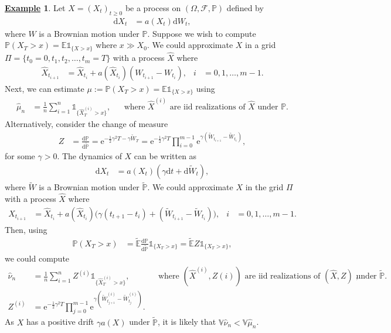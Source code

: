 \documentclass[12pt]{book}
\numberwithin{equation}{chapter}
\theoremstyle{plain}
\numberwithin{theorem}{section}
\theoremstyle{definition}
\newtheorem{example}[theorem]{\underline{Example}}
\numberwithin{exercise}{chapter}
\newcommand{\<}{\langle}
\renewcommand{\>}{\rangle}
\renewcommand{\(}{\left(}
\renewcommand{\)}{\right)}
\renewcommand{\[}{\left[}
\renewcommand{\]}{\right]}
\newcommand\Eb{\mathds{E}}
\newcommand\Ib{\mathds{1}} 	%
\newcommand\Pb{\mathds{P}}
\newcommand\Vb{\mathds{V}}
\newcommand\Fc{\mathscr{F}}
\newcommand\Om{\Omega}
\newcommand\gam{\gamma}
\newcommand\Xh{\widehat{X}}
\newcommand\nuh{\widehat{\nu}}
\newcommand\muh{\widehat{\mu}}
\newcommand\Ebt{\widetilde{\Eb}}
\newcommand\Pbt{\widetilde{\Pb}}
\newcommand\Wt{\widetilde{W}}
\newcommand\dd{\mathrm{d}}
\newcommand\ee{\mathrm{e}}
\begin{document}
\begin{example}
Let $X = (X_t)_{t \geq 0}$ be a process on $(\Om,\Fc,\Pb)$ defined by
\begin{align}
\dd X_t
	&=	a(X_t) \dd W_t ,
\end{align}
where $W$ is a Brownian motion under $\Pb$.  Suppose we wish to compute $\Pb( X_T > x ) = \Eb \Ib_{\{ X > x \} }$ where $x \gg X_0$.
We could approximate $X$ in a grid $\Pi = \{ t_0 = 0, t_1, t_2, \ldots, t_m = T \}$ with a process $\Xh$ where
\begin{align}
\Xh_{t_{i+1}}
	&=	\Xh_{t_i} + a(\Xh_{t_i}) (W_{t_{i+1}} - W_{t_i}) , &
i
	&=	0, 1, \ldots, m-1 .
\end{align}
Next, we can estimate $\mu:= \Pb( X_T > x ) = \Eb \Ib_{\{ X > x \} }$ using
\begin{align}
\muh_n
	&=	\frac{1}{n} \sum_{i=1}^n \Ib_{\{ \Xh_T^{(i)} > x \} } , &
	&\text{where $\Xh^{(i)}$ are iid realizations of $\Xh$ under $\Pb$.}
\end{align}
Alternatively, consider the change of measure
\begin{align}
Z
	&=	\frac{\dd \Pb}{\dd \Pbt}
	=		\ee^{ -\tfrac{1}{2} \gam^2 T - \gam \Wt_T } 
	=		\ee^{ -\tfrac{1}{2} \gam^2 T } \prod_{i=0}^{m-1} \ee^{ \gam (\Wt_{t_{i+1}} - \Wt_{t_i} ) } ,
\end{align}
for some $\gam > 0$.
The dynamics of $X$ can be written as
\begin{align}
\dd X_t
	&=	a(X_t) (\gam \dd t + \dd \Wt_t ) ,
\end{align}
where $\Wt$ is a Brownian motion under $\Pbt$.  We could approximate $X$ in the grid $\Pi$ with a process $\Xh$ where
\begin{align}
\Xh_{t_{i+1}}
	&=	\Xh_{t_i} + a(\Xh_{t_i}) \Big( \gam (t_{t+1} - t_i ) + (\Wt_{t_{i+1}} - \Wt_{t_i}) \Big) , &
i
	&=	0, 1, \ldots, m-1 .
\end{align}
Then, using
\begin{align}
\Pb( X_T >x)
	&=	\Ebt \frac{\dd \Pb}{ \dd \Pbt} \Ib_{\{ X_T > x \}}
	=		\Ebt Z \Ib_{\{ X_T > x \}} ,
\end{align}
we could compute
\begin{align}
\nuh_n
	&=	\frac{1}{n} \sum_{i=1}^n Z^{(i)} \Ib_{\{ \Xh_T^{(i)} > x \} } , &
	&\text{where $(\Xh^{(i)},Z{(i)})$ are iid realizations of $(\Xh,Z)$ under $\Pbt$.} , \\
Z^{(i)}
	&=	\ee^{ -\tfrac{1}{2} \gam^2 T } \prod_{j=0}^{m-1} \ee^{ \gam (\Wt_{t_{j+1}}^{(i)} - \Wt_{t_j}^{(i)} ) } .
\end{align}
As $X$ has a positive drift $\gam a(X)$ under $\Pbt$, it is likely that $\Vb \nuh_n < \Vb \muh_n$.
\end{example}
\end{document}
